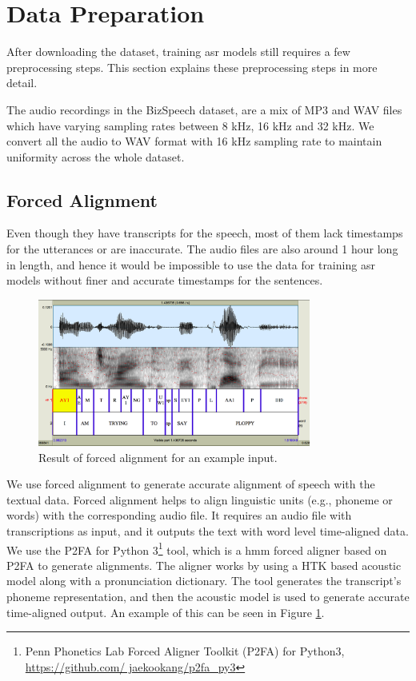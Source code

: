 \section{Data Preparation}
After downloading the dataset, training \acrshort{asr} models still requires a few preprocessing steps. This section explains these preprocessing steps in more detail. 

The audio recordings in the BizSpeech dataset, are a mix of MP3 and WAV files which have varying sampling rates between 8 kHz, 16 kHz and 32 kHz. We convert all the audio to WAV format with 16 kHz sampling rate to maintain uniformity across the whole dataset.

\subsection{Forced Alignment}
Even though they have transcripts for the speech, most of them lack timestamps for the utterances or are inaccurate. The audio files are also around 1 hour long in length, and hence it would be impossible to use the data for training \acrshort{asr} models without finer and accurate timestamps for the sentences. 

\begin{figure}[ht]
  \begin{center}
    \includegraphics[width=0.8\textwidth]{images/ploppy.png} 
    \caption{Result of forced alignment for an example input. \cite{Yuan2008SPEAKERCORPUS}}
    \label{fig:p2fa}
  \end{center}
\end{figure}

We use forced alignment to generate accurate alignment of speech with the textual data. Forced alignment helps to align linguistic units (e.g., phoneme or words) with the corresponding audio file. It requires an audio file with transcriptions as input, and it outputs the text with word level time-aligned data. We use the P2FA for Python 3\footnote{Penn Phonetics Lab Forced Aligner Toolkit (P2FA) for Python3, \href{https://github.com/jaekookang/p2fa\_py3}{https://github.com/ jaekookang/p2fa\_py3}} tool, which is a \acrshort{hmm} forced aligner based on P2FA \cite{Yuan2008SPEAKERCORPUS} to generate alignments. The aligner works by using a HTK \cite{Young2002TheBook} based acoustic model along with a pronunciation dictionary. The tool generates the transcript's phoneme representation, and then the acoustic model is used to generate accurate time-aligned output. An example of this can be seen in Figure \ref{fig:p2fa}.

